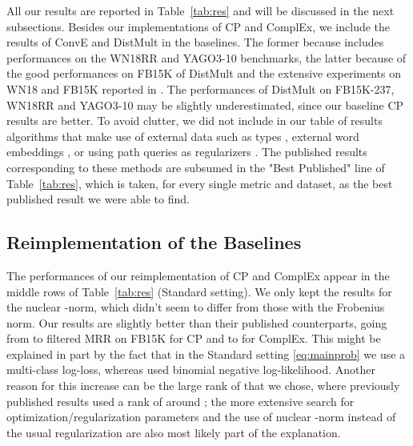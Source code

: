 \documentclass{article}
\newcommand{\CP}{{CP}\xspace}
\newcommand{\complex}{{ComplEx}\xspace}
\newcommand{\distmult}{{DistMult}\xspace}
\newcommand{\conve}{{ConvE}\xspace}
\newcommand{\fb}{{FB15K}\xspace}
\newcommand{\fbd}{{FB15K-237}\xspace}
\newcommand{\wn}{{WN18}\xspace}
\newcommand{\wnrr}{{WN18RR}\xspace}
\newcommand{\yago}{{YAGO3-10}\xspace}
\begin{document}
All our results are reported in Table~\ref{tab:res} and will be discussed in the next subsections. Besides our implementations of \CP and \complex, we include the results of \conve and \distmult in the baselines. The former because \citet{dettmers2017convolutional} includes performances on the \wnrr and \yago benchmarks, the latter because of the good performances on \fb of \distmult and the extensive experiments on \wn and \fb reported in \citet{kadlec_knowledge_2017}. The performances of \distmult on \fbd, \wnrr and \yago may be slightly underestimated, since our baseline \CP results are better. To avoid clutter, we did not include in our table of results algorithms that make use of external data such as types \citep{krompas_s_type-constrained_2015},  external word embeddings \citep{toutanova_observed_2015}, or using path queries as regularizers \citep{guu_traversing_2015}. The published results corresponding to these methods are subsumed in the "Best Published" line of Table~\ref{tab:res}, which is taken, for every single metric and dataset, as the best published result we were able to find.

\subsection{Reimplementation of the Baselines}
The performances of our reimplementation of \CP and \complex appear in the middle rows of Table~\ref{tab:res} (Standard setting). We only kept the results for the nuclear -norm, which didn't seem to differ from those with the Frobenius norm. Our results are slightly better than their published counterparts, going from  to  filtered MRR on \fb for \CP and  to  for \complex.  This might be explained in part by the fact that in the Standard setting \eqref{eq:mainprob} we use a multi-class log-loss, whereas \citet{trouillon_complex_2016} used binomial negative log-likelihood. Another reason for this increase can be the large rank of  that we chose, where previously published results used a rank of around ; the more extensive search for optimization/regularization parameters and the use of nuclear -norm instead of the usual regularization are also most likely part of the explanation.
\end{document}
